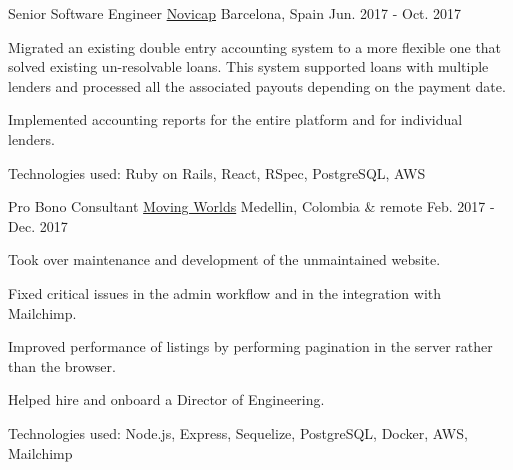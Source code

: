 \documentclass[11pt, a4paper]{awesome-cv}
\begin{document}
\begin{cventries}
  \cventry
    {Senior Software Engineer} %
    {\href{https://novicap.com/}{Novicap}} %
    {Barcelona, Spain} %
    {Jun. 2017 - Oct. 2017} %
    {
      \begin{cvitems} %
        \item {Migrated an existing double entry accounting system to a more flexible one that solved existing un-resolvable loans. This system supported loans with multiple lenders and processed all the associated payouts depending on the payment date.}
        \item {Implemented accounting reports for the entire platform and for individual lenders.}
        \item {Technologies used: Ruby on Rails, React, RSpec, PostgreSQL, AWS}
      \end{cvitems}
    }

  \cventry
    {Pro Bono Consultant} %
    {\href{https://movingworlds.org/}{Moving Worlds}} %
    {Medellin, Colombia \& remote} %
    {Feb. 2017 - Dec. 2017} %
    {
      \begin{cvitems} %
        \item {Took over maintenance and development of the unmaintained website.}
        \item {Fixed critical issues in the admin workflow and in the integration with Mailchimp.}
        \item {Improved performance of listings by performing pagination in the server rather than the browser.}
        \item {Helped hire and onboard a Director of Engineering.}
        \item {Technologies used: Node.js, Express, Sequelize, PostgreSQL, Docker, AWS, Mailchimp}
      \end{cvitems}
    }


\end{cventries}
\end{document}
